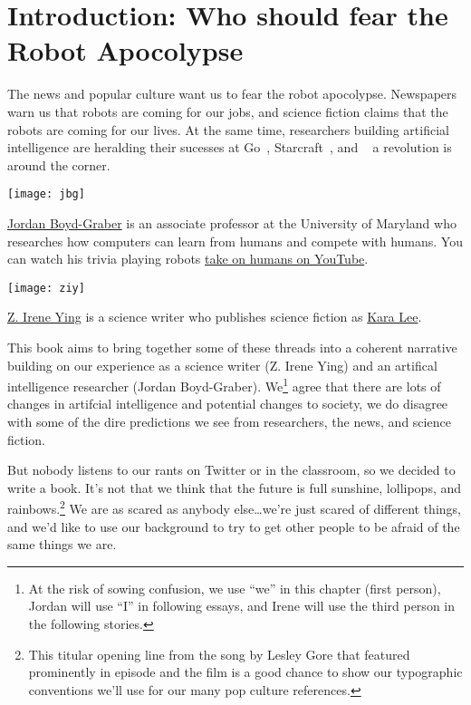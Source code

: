 \cleardoublepage
\chapter{Introduction: Who should fear the Robot Apocolypse}


The news and popular culture want us to fear the robot apocolypse.  Newspapers warn us that robots are coming for our jobs, and science fiction claims that the robots are coming for our lives.  At the same time, researchers building artificial intelligence are heralding their sucesses at Go~\cite{silver-16}, Starcraft~\cite{vinyals2017starcraft}, and ~\cite{ferruci-10} a revolution is around the corner.

\begin{marginfigure}%
  \texttt{[image: jbg]}
  \caption{\href{http://boydgraber.org}{Jordan Boyd-Graber} is an associate professor at the University of Maryland who researches how computers can learn from humans and compete with humans.  You can watch his trivia playing robots \href{http://qanta.org/home/past-events}{take on humans on YouTube}.}
  \label{fig:marginfig}
\end{marginfigure}

\begin{marginfigure}%
  \texttt{[image: ziy]}
  \caption{\href{http://www.ireneying.net/}{Z. Irene Ying} is a science writer who publishes science fiction as \href{http://www.windupdreams.net/}{Kara Lee}.}
  \label{fig:marginfig}
\end{marginfigure}

This book aims to bring together some of these threads into a coherent
narrative building on our experience as a science writer (Z. Irene
Ying) and an artifical intelligence researcher (Jordan Boyd-Graber).
We\footnote{At the risk of sowing confusion, we use ``we'' in this
chapter (first person), Jordan will use ``I'' in following essays, and
Irene will use the third person in the following stories.} agree that
there are lots of changes in artifcial intelligence and potential
changes to society, we do disagree with some of the dire predictions
we see from researchers, the news, and science fiction.

But nobody listens to our rants on Twitter or in the classroom, so we
decided to write a book.  It's not that we think that the future is
full sunshine, lollipops, and rainbows.\footnote{This titular opening
line from the song  by Lesley
Gore that featured prominently in 
episode  and the film  is a good chance to show our typographic
conventions we'll use for our many pop culture references.}  We are as
scared as anybody else\dots we're just scared of different things, and
we'd like to use our background to try to get other people to be
afraid of the same things we are.

